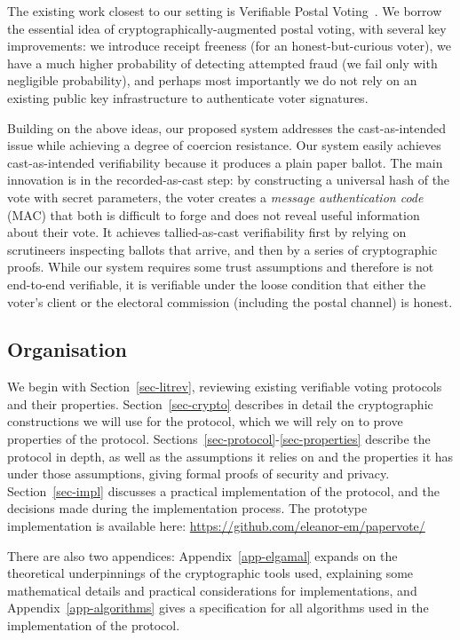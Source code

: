 \documentclass[12pt,a4paper]{article}
\theoremstyle{definition}
\begin{document}
The existing work closest to our setting is Verifiable Postal Voting~\cite{benaloh2013verifiable}. We borrow the essential idea of cryptographically-augmented postal voting, with several key improvements: we introduce receipt freeness (for an honest-but-curious voter), we have a much higher probability of detecting attempted fraud (we fail only with negligible probability), and perhaps most importantly we do not rely on an existing public key infrastructure to authenticate voter signatures.

Building on the above ideas, our proposed system addresses the cast-as-intended issue while achieving a degree of coercion resistance. Our system easily achieves cast-as-intended verifiability because it produces a plain paper ballot. The main innovation is in the recorded-as-cast step: by constructing a universal hash of the vote with secret parameters, the voter creates a \textit{message authentication code} (MAC) that both is difficult to forge and does not reveal useful information about their vote. It achieves tallied-as-cast verifiability first by relying on scrutineers inspecting ballots that arrive, and then by a series of cryptographic proofs. While our system requires some trust assumptions and therefore is not end-to-end verifiable, it is verifiable under the loose condition that either the voter's client or the electoral commission (including the postal channel) is honest.

\subsection{Organisation}
We begin with Section~\ref{sec-litrev}, reviewing existing verifiable voting protocols and their properties. Section~\ref{sec-crypto} describes in detail the cryptographic constructions we will use for the protocol, which we will rely on to prove properties of the protocol. Sections~\ref{sec-protocol}-\ref{sec-properties} describe the protocol in depth, as well as the assumptions it relies on and the properties it has under those assumptions, giving formal proofs of security and privacy. Section~\ref{sec-impl} discusses a practical implementation of the protocol, and the decisions made during the implementation process. The prototype implementation is available here: \url{https://github.com/eleanor-em/papervote/}

There are also two appendices: Appendix~\ref{app-elgamal} expands on the theoretical underpinnings of the cryptographic tools used, explaining some mathematical details and practical considerations for implementations, and Appendix~\ref{app-algorithms} gives a specification for all algorithms used in the implementation of the protocol.
\end{document}
